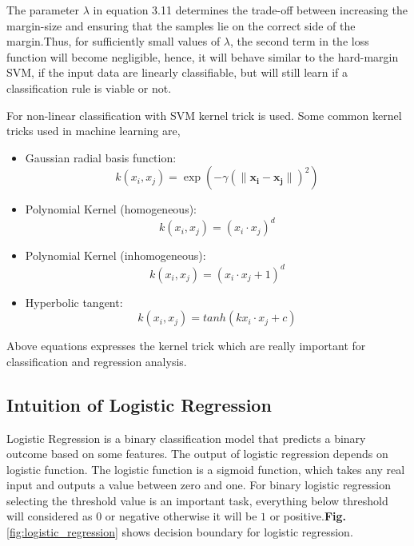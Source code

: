 \documentclass[12pt,a4paper]{report}
\begin{document}
The parameter $\lambda $ in equation 3.11 determines the trade-off between increasing the margin-size and ensuring that the samples lie on the correct side of the margin.Thus, for sufficiently small values of $\lambda $, the second term in the loss function will become negligible, hence, it will behave similar to the hard-margin SVM, if the input data are linearly classifiable, but will still learn if a classification rule is viable or not.
\par\noindent
For non-linear classification with SVM kernel trick is used. Some common kernel tricks used in machine learning are,
\begin{itemize}
    \item Gaussian radial basis function:
    \begin{equation}
         k(x_{i}, x_{j}) = \exp{(-\gamma(\lVert \mathbf{x_{i}-x_{j}} \rVert)^2)}
    \end{equation}
    \item Polynomial Kernel (homogeneous):
    \begin{equation}
        k(x_{i}, x_{j}) = (x_{i}\cdot x_{j})^d
    \end{equation}
     \item Polynomial Kernel (inhomogeneous):
     \begin{equation}
         k(x_{i}, x_{j}) = (x_{i}\cdot x_{j}+1)^d
     \end{equation}
    \item Hyperbolic tangent:
    \begin{equation}
       k(x_{i}, x_{j}) = tanh(kx_{i}\cdot x_{j}+c) 
    \end{equation}
\end{itemize}
Above equations expresses the kernel trick which are really important for classification and regression analysis.

\subsection{Intuition of Logistic Regression}
Logistic Regression is a binary classification model that predicts a binary outcome based on some features. The output of logistic regression depends on logistic function. The logistic function is a sigmoid function, which takes any real input and outputs a value between zero and one. For binary logistic regression selecting the threshold value is an important task, everything below threshold will considered as $0$ or negative otherwise it will be $1$ or  positive.\textbf{Fig.} \ref{fig:logistic_regression} shows decision boundary for logistic regression.  
\end{document}
